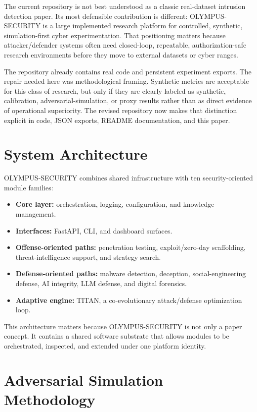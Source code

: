 \documentclass[conference]{IEEEtran}
\begin{document}
The current repository is not best understood as a classic real-dataset intrusion
detection paper. Its most defensible contribution is different: OLYMPUS-SECURITY
is a large implemented research platform for controlled, synthetic,
simulation-first cyber experimentation. That positioning matters because
attacker/defender systems often need closed-loop, repeatable, authorization-safe
research environments before they move to external datasets or cyber ranges.

The repository already contains real code and persistent experiment exports. The
repair needed here was methodological framing. Synthetic metrics are acceptable
for this class of research, but only if they are clearly labeled as synthetic,
calibration, adversarial-simulation, or proxy results rather than as direct
evidence of operational superiority. The revised repository now makes that
distinction explicit in code, JSON exports, README documentation, and this paper.

\section{System Architecture}

OLYMPUS-SECURITY combines shared infrastructure with ten security-oriented module
families:
\begin{itemize}
  \item \textbf{Core layer:} orchestration, logging, configuration, and knowledge management.
  \item \textbf{Interfaces:} FastAPI, CLI, and dashboard surfaces.
  \item \textbf{Offense-oriented paths:} penetration testing, exploit/zero-day scaffolding, threat-intelligence support, and strategy search.
  \item \textbf{Defense-oriented paths:} malware detection, deception, social-engineering defense, AI integrity, LLM defense, and digital forensics.
  \item \textbf{Adaptive engine:} TITAN, a co-evolutionary attack/defense optimization loop.
\end{itemize}

This architecture matters because OLYMPUS-SECURITY is not only a paper concept.
It contains a shared software substrate that allows modules to be orchestrated,
inspected, and extended under one platform identity.

\section{Adversarial Simulation Methodology}
\end{document}
